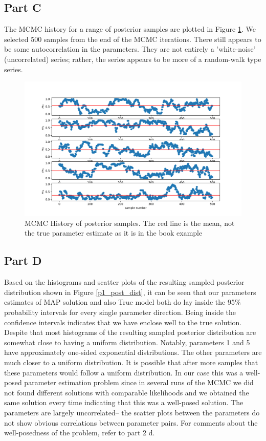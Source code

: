 \documentclass{article}
\begin{document}
\subsection*{Part C}
The MCMC history for a range of posterior samples are plotted in Figure \ref{fig:post_samples}. We selected 500 samples from the end of the MCMC iterations. There still appears to be some autocorrelation in the parameters. They are not entirely a 'white-noise' (uncorrelated) series; rather, the series appears to be more of a random-walk type series. 

\begin{figure}[!ht]
    \centering
    \includegraphics[width=4.5in]{part1_samples.png}
    \caption{MCMC History of posterior samples. The red line is the mean, not the true parameter estimate as it is in the book example}
    \label{fig:post_samples}
\end{figure}

\FloatBarrier

\subsection*{Part D}
Based on the histograms and scatter plots of the resulting sampled posterior distribution shown in Figure \ref{p1_post_dist}, it can be seen that our parameters estimates of MAP solution and also True model both do lay inside the 95\% probability intervals for every single parameter direction. Being inside the confidence intervals indicates that we have enclose well to the true solution. 
Despite that most histograms of the resulting sampled posterior distribution are somewhat close to having a uniform distribution. Notably, parameters 1 and 5 have approximately one-sided exponential distributions. The other parameters are much closer to a uniform distribution. It is possible that after more samples that these parameters would follow a uniform distribution. In our case this was a well-posed parameter estimation problem since in several runs of the MCMC we did not found different solutions with comparable likelihoods and we obtained the same solution every time indicating that this was a well-posed solution. The parameters are largely uncorrelated-- the scatter plots between the parameters do not show obvious correlations between parameter pairs. For comments about the well-posedness of the problem, refer to part 2 d. 
\end{document}
